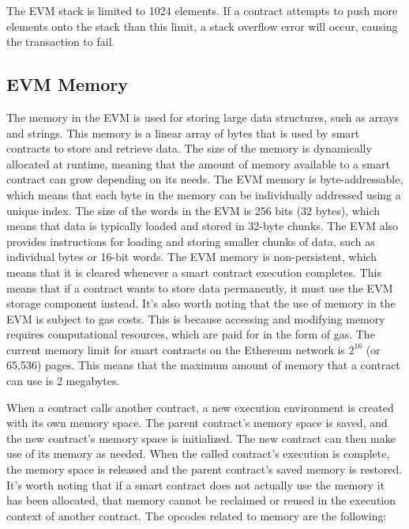 The EVM stack is limited to 1024 elements.
If a contract attempts to push more elements onto the stack than this limit, a stack overflow error will occur, causing the transaction to fail. 

\subsection{EVM Memory}
The memory in the EVM is used for storing large data structures, such as arrays and strings.
This memory is a linear array of bytes that is used by smart contracts to store and retrieve data. 
The size of the memory is dynamically allocated at runtime, meaning that the amount of memory available to a smart contract can grow depending on its needs.
The EVM memory is byte-addressable, which means that each byte in the memory can be individually addressed using a unique index. The size of the words in the EVM is 256 bits (32 bytes), which means that data is typically loaded and stored in 32-byte chunks. The EVM also provides instructions for loading and storing smaller chunks of data, such as individual bytes or 16-bit words.
The EVM memory is non-persistent, which means that it is cleared whenever a smart contract execution completes. This means that if a contract wants to store data permanently, it must use the EVM storage component instead.
It's also worth noting that the use of memory in the EVM is subject to gas costs. This is because accessing and modifying memory requires computational resources, which are paid for in the form of gas.
The current memory limit for smart contracts on the Ethereum network is $2^{16}$ (or 65,536) pages. This means that the maximum amount of memory that a contract can use is 2 megabytes. 

When a contract calls another contract, a new execution environment is created with its own memory space.
The parent contract's memory space is saved, and the new contract's memory space is initialized.
The new contract can then make use of its memory as needed.
When the called contract's execution is complete, the memory space is released and the parent contract's saved memory is restored. 
It's worth noting that if a smart contract does not actually use the memory it has been allocated, that memory cannot be reclaimed or reused in the execution context of another contract.
The opcodes related to memory are the following:

